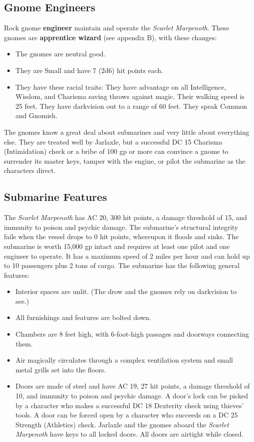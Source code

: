 \documentclass[10pt,a4paper,twoside,twocolumn,openany,nodeprecatedcode]{dndbook}
\begin{document}
\subsection{Gnome Engineers}
Rock gnome \textbf{engineer} maintain and operate the \textit{Scarlet Marpenoth}. These gnomes are \textbf{apprentice wizard} (see appendix B), with these changes:
\begin{itemize}

\item The gnomes are neutral good.
\item They are Small and have 7 (2d6) hit points each.
\item They have these racial traits: They have advantage on all Intelligence, Wisdom, and Charisma saving throws against magic. Their walking speed is 25 feet. They have darkvision out to a range of 60 feet. They speak Common and Gnomish.
\end{itemize}


The gnomes know a great deal about submarines and very little about everything else. They are treated well by Jarlaxle, but a successful DC 15 Charisma (Intimidation) check or a bribe of 100 gp or more can convince a gnome to surrender its master keys, tamper with the engine, or pilot the submarine as the characters direct.
\subsection{Submarine Features}
The \textit{Scarlet Marpenoth} has AC 20, 300 hit points, a damage threshold of 15, and immunity to poison and psychic damage. The submarine's structural integrity fails when the vessel drops to 0 hit points, whereupon it floods and sinks. The submarine is worth 15,000 gp intact and requires at least one pilot and one engineer to operate. It has a maximum speed of 2 miles per hour and can hold up to 10 passengers plus 2 tons of cargo.
The submarine has the following general features:
\begin{itemize}

\item Interior spaces are unlit. (The drow and the gnomes rely on darkvision to see.)
\item All furnishings and features are bolted down.
\item Chambers are 8 feet high, with 6-foot-high passages and doorways connecting them.
\item Air magically circulates through a complex ventilation system and small metal grills set into the floors.
\item Doors are made of steel and have AC 19, 27 hit points, a damage threshold of 10, and immunity to poison and psychic damage. A door's lock can be picked by a character who makes a successful DC 18 Dexterity check using thieves' tools. A door can be forced open by a character who succeeds on a DC 25 Strength (Athletics) check. Jarlaxle and the gnomes aboard the \textit{Scarlet Marpenoth} have keys to all locked doors. All doors are airtight while closed.
\end{itemize}
\end{document}
